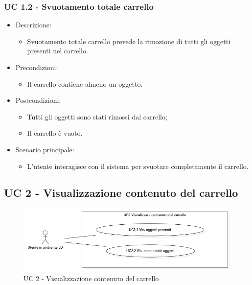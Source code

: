 \subsubsection{UC 1.2 - Svuotamento totale carrello}
\begin{itemize}
	
	\item Descrizione:
	\begin{itemize}
		\item Svuotamento totale carrello prevede la rimozione di tutti gli oggetti presenti nel carrello.
	\end{itemize}
	
	\item Precondizioni:
	\begin{itemize}
		\item Il carrello contiene almeno un oggetto.
	\end{itemize}
	
	\item Postcondizioni:
	\begin{itemize}
		\item Tutti gli oggetti sono stati rimossi dal carrello;
		\item Il carrello è vuoto.
	\end{itemize}
	
	\item Scenario principale:
	\begin{itemize}
		\item L'utente interagisce con il sistema per svuotare completamente il carrello.
	\end{itemize}
	
\end{itemize}

\subsection{UC 2 - Visualizzazione contenuto del carrello}

\begin{figure}[H]
  \renewcommand{\thefigure}{2}
  \includegraphics[width=\linewidth]{./res/images/UC2.png}
  \caption{UC 2 - Visualizzazione contenuto del carrello}
  \label{fig:UC 2}
\end{figure}

